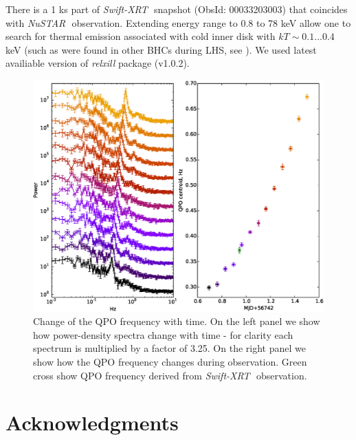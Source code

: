 \documentclass[a4paper,fleqn,usenatbib]{mnras}
\def\swiftx{{\em Swift-XRT\,}}
\def\nustar{{\em NuSTAR\,}}
\begin{document}
There is a 1 ks part of \swiftx\, snapshot (ObsId: 00033203003) that coincides with \nustar\, observation.  Extending energy range to 0.8 to 78 keV allow one to search for thermal emission associated with cold inner disk with $kT \sim 0.1...0.4$ keV (such as were found in other BHCs during LHS, see \cite[][ e.t.c]{miller06b,miller06a,parker15}).
We used latest availiable version of {\it relxill} package (v1.0.2). 

\begin{figure}
\centerline{\includegraphics[scale=0.7]{QPOdrift_v02.eps}}
\caption{Change of the QPO frequency with time. On the left panel we show how power-density spectra change with time - for clarity each spectrum is multiplied by a factor of 3.25. On the right panel we show how the QPO frequency changes during observation. Green cross show QPO frequency derived from \swiftx\, observation.} 
\label{fig:qpodrift}
\end{figure}  


\section*{Acknowledgments}



\bsp	
\label{lastpage}
\end{document}
